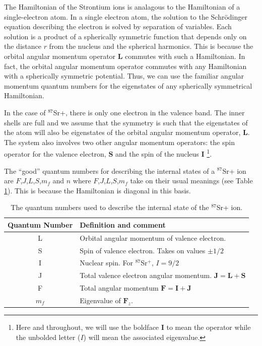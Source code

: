 The Hamiltonian of the Strontium ions is analagous to the Hamiltonian of a single-electron atom. 
In a single electron atom, the solution to the Schr\"odinger equation describing the electron is solved by separation of variables.
 Each solution is a product of a spherically symmetric function that depends only on the distance $r$ from the nucleus and the spherical harmonics.
This is because the orbital angular momentum operator $\mathbf{L}$ commutes with such a Hamiltonian. In fact, the orbital angular momentum operator commutes with any Hamiltonian with a spherically symmetric potential.
Thus, we can use the familiar angular momentum quantum numbers for the eigenstates of any spherically symmetrical Hamiltonian.

In the case of $^{87}$Sr+, there is only one electron in the valence band. The inner shells are full and we assume that the symmetry is such that the eigenstates of the atom will also be eigenstates of the orbital angular momentum operator, $\mathbf{L}$.
 The system also involves two other angular momentum operators: the spin operator for the valence electron, $\mathbf{S}$%
 and the spin of the nucleus $\mathbf{I}$ \footnote{Here and throughout, we will use the boldface $\mathbf{I}$ to mean the operator while the unbolded letter ($I$) will mean the associated eigenvalue.}.

The ``good'' quantum numbers for describing the internal states of a $^{87}$Sr+ ion are $F$,$J$,$L$,$S$,$m_f$ and $n$\cite{experimental_hyperfine_alkali_arimondo}\cite{cuaMITnotes} where $F$,$J$,$L$,$S$,$m_f$ take on their usual meanings (see Table\,\ref{quantumNumberQuickref}). This is because the Hamiltonian is diagonal in this basis.

\begin{table}[h!]
\centering
\begin{tabular}{|c|l|}
\hline
Quantum Number & Definition and comment \\ \hline \hline
L & Orbital angular momentum of valence electron. \\ \hline
S & Spin of valence electron. Takes on values $\pm 1/2$ \\ \hline
I & Nuclear spin. For $^{87}$Sr$^+$, $I=9/2$ \\ \hline
J & Total valence electron angular momentum. $\mathbf{J}=\mathbf{L}+\mathbf{S}$ \\ \hline
F & Total angular momentum $\mathbf{F}=\mathbf{I}+\mathbf{J}$ \\ \hline
$m_f$ & Eigenvalue of $\mathbf{F}_z$.\\ \hline
\end{tabular}
\caption{The quantum numbers used to describe the internal state of the $^{87}$Sr+ ion.}
\label{quantumNumberQuickref}
\end{table}

